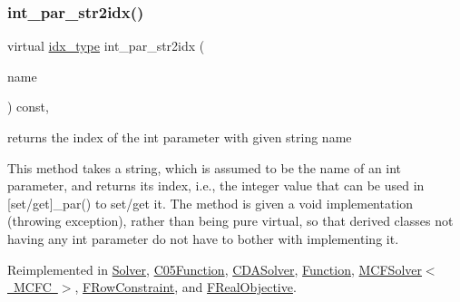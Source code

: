 \mbox{\label{class_s_m_spp__di__unipi__it_1_1_thin_compute_interface_a69c6857c4288135135e8b6bbcf24252a}} 
\subsubsection{\texorpdfstring{int\+\_\+par\+\_\+str2idx()}{int\_par\_str2idx()}}
{\footnotesize\ttfamily virtual \mbox{\hyperlink{class_s_m_spp__di__unipi__it_1_1_thin_compute_interface_aa3d710629ad8c434286726ad810c3b47}{idx\+\_\+type}} int\+\_\+par\+\_\+str2idx (\begin{DoxyParamCaption}\item[{const std\+::string \&}]{name }\end{DoxyParamCaption}) const\hspace{0.3cm}{\ttfamily [inline]}, {\ttfamily [virtual]}}



returns the index of the int parameter with given string name 

This method takes a string, which is assumed to be the name of an int parameter, and returns its index, i.\+e., the integer value that can be used in \mbox{[}set/get\mbox{]}\+\_\+par() to set/get it. The method is given a void implementation (throwing exception), rather than being pure virtual, so that derived classes not having any int parameter do not have to bother with implementing it. 

Reimplemented in \mbox{\hyperlink{class_s_m_spp__di__unipi__it_1_1_solver_ae281b6699b0707a5cdc1e82b76d26c09}{Solver}}, \mbox{\hyperlink{class_s_m_spp__di__unipi__it_1_1_c05_function_ae281b6699b0707a5cdc1e82b76d26c09}{C05\+Function}}, \mbox{\hyperlink{class_s_m_spp__di__unipi__it_1_1_c_d_a_solver_ae281b6699b0707a5cdc1e82b76d26c09}{C\+D\+A\+Solver}}, \mbox{\hyperlink{class_s_m_spp__di__unipi__it_1_1_function_ae281b6699b0707a5cdc1e82b76d26c09}{Function}}, \mbox{\hyperlink{class_s_m_spp__di__unipi__it_1_1_m_c_f_solver_ae281b6699b0707a5cdc1e82b76d26c09}{M\+C\+F\+Solver$<$ M\+C\+F\+C $>$}}, \mbox{\hyperlink{class_s_m_spp__di__unipi__it_1_1_f_row_constraint_ae281b6699b0707a5cdc1e82b76d26c09}{F\+Row\+Constraint}}, and \mbox{\hyperlink{class_s_m_spp__di__unipi__it_1_1_f_real_objective_ae281b6699b0707a5cdc1e82b76d26c09}{F\+Real\+Objective}}.

